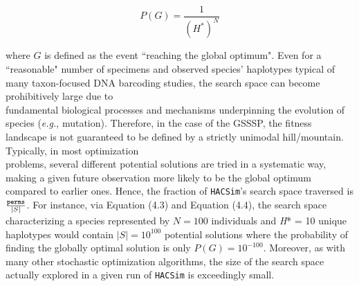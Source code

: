 \begin{equation}
P(G) = \frac{1}{(H^*)^N}
\end{equation} 

\noindent where $G$ is defined as the event ``reaching the global optimum". Even for a ``reasonable" number of specimens and observed species' haplotypes typical of many taxon-focused DNA barcoding studies, the search space can become prohibitively large due to \\ fundamental biological processes and mechanisms underpinning the evolution of species (\textit{e.g.}, mutation). Therefore, in the case of the GSSSP, the fitness landscape is not guaranteed to be defined by a strictly unimodal hill/mountain. Typically, in most optimization \\ problems, several different potential solutions are tried in a systematic way, making a given future observation more likely to be the global optimum compared to earlier ones. Hence, the fraction of {\tt HACSim}'s search space traversed is $\frac{{\tt perms}}{|S|}$. For instance, via Equation (4.3) and Equation (4.4), the search space characterizing a species represented by $N = 100$ individuals and \textit{H}* = 10 unique haplotypes would contain $|S| = 10^{100}$ potential solutions where the probability of finding the globally optimal solution is only $P(G) = 10^{-100}$. Moreover, as with many other stochastic optimization algorithms, the size of the search space actually explored in a given run of {\tt HACSim} is exceedingly small.

\vspace{5mm}

